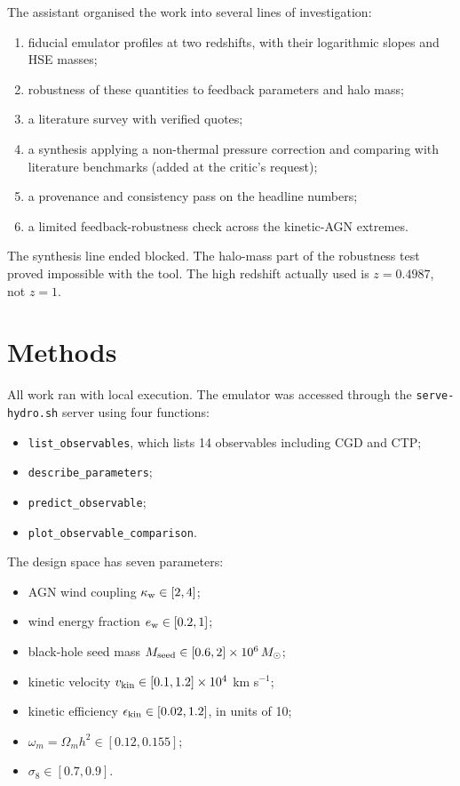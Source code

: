 \documentclass[11pt,a4paper]{article}
\begin{document}
The assistant organised the work into several lines of investigation:
\begin{enumerate}
\item fiducial emulator profiles at two redshifts, with their logarithmic slopes and HSE masses;
\item robustness of these quantities to feedback parameters and halo mass;
\item a literature survey with verified quotes;
\item a synthesis applying a non-thermal pressure correction and comparing with literature benchmarks (added at the critic's request);
\item a provenance and consistency pass on the headline numbers;
\item a limited feedback-robustness check across the kinetic-AGN extremes.
\end{enumerate}

The synthesis line ended blocked. The halo-mass part of the robustness test proved impossible with the tool. The high redshift actually used is $z=0.4987$, not $z=1$.

\section{Methods}
All work ran with local execution. The emulator was accessed through the \texttt{serve-hydro.sh} server using four functions:
\begin{itemize}
\item \texttt{list\_observables}, which lists 14 observables including CGD and CTP;
\item \texttt{describe\_parameters};
\item \texttt{predict\_observable};
\item \texttt{plot\_observable\_comparison}.
\end{itemize}

The design space has seven parameters:
\begin{itemize}
\item AGN wind coupling $\kappa_{\rm w}\in[2,4]$;
\item wind energy fraction $e_{\rm w}\in[0.2,1]$;
\item black-hole seed mass $M_{\rm seed}\in[0.6,2]\times10^6\,M_\odot$;
\item kinetic velocity $v_{\rm kin}\in[0.1,1.2]\times10^4$ km s$^{-1}$;
\item kinetic efficiency $\epsilon_{\rm kin}\in[0.02,1.2]$, in units of 10;
\item $\omega_m=\Omega_m h^2\in[0.12,0.155]$;
\item $\sigma_8\in[0.7,0.9]$.
\end{itemize}
\end{document}
